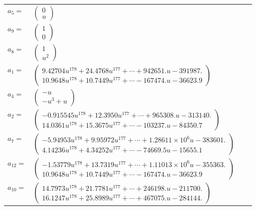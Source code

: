 \documentclass[1p]{elsarticle_modified}
\theoremstyle{definition}
\begin{document}
\begin{tabular}{m{7pt} m{180pt} m{7pt} m{180pt} }
\flushright $a_{5}=$&$\begin{pmatrix}0\\u\end{pmatrix}$ \\
\flushright $a_{9}=$&$\begin{pmatrix}1\\0\end{pmatrix}$ \\
\flushright $a_{8}=$&$\begin{pmatrix}1\\u^2\end{pmatrix}$ \\
\flushright $a_{1}=$&$\begin{pmatrix}9.42704 u^{178}+24.4768 u^{177}+\cdots+942651. u-391987.\\10.9648 u^{178}+10.7449 u^{177}+\cdots-167474. u-36623.9\end{pmatrix}$ \\
\flushright $a_{4}=$&$\begin{pmatrix}- u\\- u^3+u\end{pmatrix}$ \\
\flushright $a_{2}=$&$\begin{pmatrix}-0.915545 u^{178}+12.3950 u^{177}+\cdots+965308. u-313140.\\14.0361 u^{178}+15.3675 u^{177}+\cdots-103237. u-84350.7\end{pmatrix}$ \\
\flushright $a_{7}=$&$\begin{pmatrix}-5.94953 u^{178}+9.95972 u^{177}+\cdots+1.28611\times10^{6} u-383601.\\4.14236 u^{178}+4.34252 u^{177}+\cdots-74669.5 u-15655.1\end{pmatrix}$ \\
\flushright $a_{12}=$&$\begin{pmatrix}-1.53779 u^{178}+13.7319 u^{177}+\cdots+1.11013\times10^{6} u-355363.\\10.9648 u^{178}+10.7449 u^{177}+\cdots-167474. u-36623.9\end{pmatrix}$ \\
\flushright $a_{10}=$&$\begin{pmatrix}14.7973 u^{178}+21.7781 u^{177}+\cdots+246198. u-211700.\\16.1247 u^{178}+25.8989 u^{177}+\cdots+467075. u-284144.\end{pmatrix}$ \\

\end{tabular}
\end{document}
